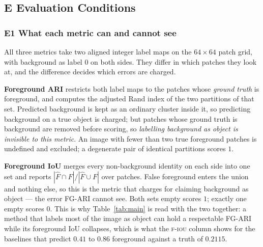 %

\subsection{E Evaluation Conditions}

\subsubsection{E1 What each metric can and cannot see}
All three metrics take two aligned integer label maps on the $64\times64$ patch grid, with
background as label $0$ on both sides. They differ in which patches they look at, and the
difference decides which errors are charged.

\textbf{Foreground ARI} restricts both label maps to the patches whose \emph{ground truth} is
foreground, and computes the adjusted Rand index of the two partitions of that set. Predicted
background is kept as an ordinary cluster inside it, so predicting background on a true object
is charged; but patches whose ground truth is background are removed before scoring, so
\emph{labelling background as object is invisible to this metric}. An image with fewer than two
true foreground patches is undefined and excluded; a degenerate pair of identical partitions
scores $1$.

\textbf{Foreground IoU} merges every non-background identity on each side into one set and
reports $|{\hat F}\cap F|/|{\hat F}\cup F|$ over patches. False foreground enters the union and
nothing else, so this is the metric that charges for claiming background as object --- the error
FG-ARI cannot see. Both sets empty scores $1$; exactly one empty scores $0$. This is why
Table~\ref{tab:main} is read with the two together: a method that labels most of the image as
object can hold a respectable FG-ARI while its foreground IoU collapses, which is what the
\textsc{f-iou} column shows for the baselines that predict $0.41$ to $0.86$ foreground against a
truth of $0.2115$.


